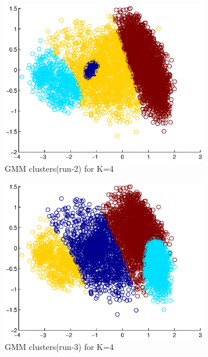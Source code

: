 \documentclass[a4paper]{article}
\begin{document}
\begin{enumerate}
		\begin{figure}[H]
			\begin{center}
				\includegraphics[width=0.8\textwidth]{GMM_K4_1.eps}
				\caption{GMM clusters(run-2) for K=4}\label{fig:gmm_k4_1}
			\end{center}
		\end{figure}

		\begin{figure}[H]
			\begin{center}
				\includegraphics[width=0.8\textwidth]{GMM_K4_2.eps}
				\caption{GMM clusters(run-3) for K=4}\label{fig:gmm_k4_2}
			\end{center}
		\end{figure}		



\end{enumerate}
\end{document}
